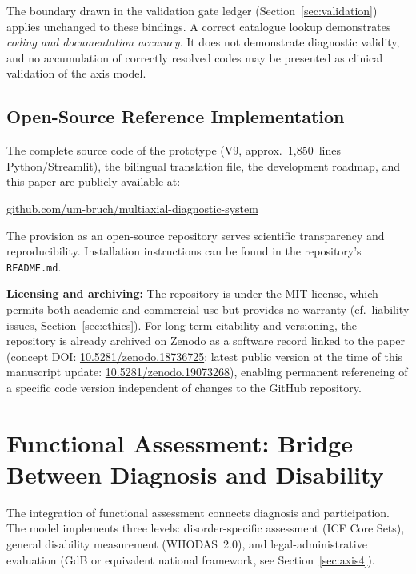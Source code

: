 \documentclass[11pt,a4paper]{article}
\begin{document}
The boundary drawn in the validation gate ledger (Section~\ref{sec:validation}) applies unchanged to these bindings. A correct catalogue lookup demonstrates \emph{coding and documentation accuracy}. It does not demonstrate diagnostic validity, and no accumulation of correctly resolved codes may be presented as clinical validation of the axis model.

\subsection{Open-Source Reference Implementation}

The complete source code of the prototype (V9, approx.\ 1,850~lines Python/Streamlit), the bilingual translation file, the development roadmap, and this paper are publicly available at:

\begin{center}
\href{https://github.com/um-bruch/multiaxial-diagnostic-system}{github.com/um-bruch/multiaxial-diagnostic-system}
\end{center}

\noindent The provision as an open-source repository serves scientific transparency and reproducibility. Installation instructions can be found in the repository's \texttt{README.md}.

\textbf{Licensing and archiving:} The repository is under the MIT license, which permits both academic and commercial use but provides no warranty (cf.\ liability issues, Section~\ref{sec:ethics}). For long-term citability and versioning, the repository is already archived on Zenodo as a software record linked to the paper (concept DOI: \href{https://doi.org/10.5281/zenodo.18736725}{10.5281/zenodo.18736725}; latest public version at the time of this manuscript update: \href{https://doi.org/10.5281/zenodo.19073268}{10.5281/zenodo.19073268}), enabling permanent referencing of a specific code version independent of changes to the GitHub repository.

\section{Functional Assessment: Bridge Between Diagnosis and Disability}
\label{sec:functional}

The integration of functional assessment connects diagnosis and participation. The model implements three levels: disorder-specific assessment (ICF Core Sets), general disability measurement (WHODAS~2.0), and legal-administrative evaluation (GdB or equivalent national framework, see Section~\ref{sec:axis4}).
\end{document}
